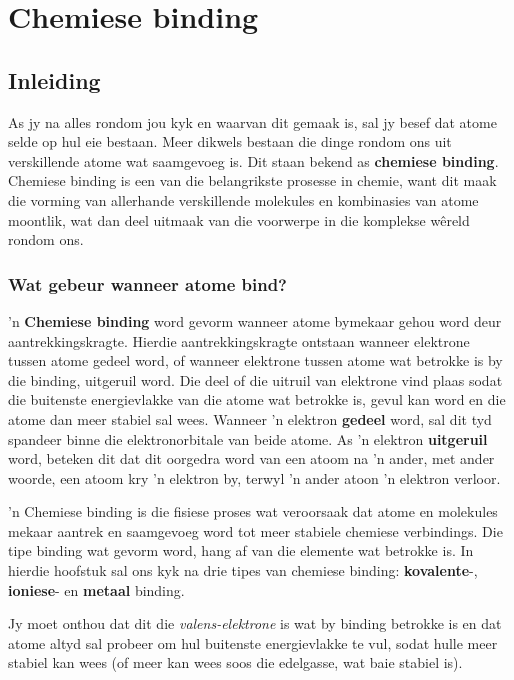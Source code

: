          \chapter{Chemiese binding}
    \setcounter{figure}{1}
    \setcounter{subfigure}{1}
    \label{m38704*cid1}
            \section{Inleiding}
            \nopagebreak

As jy na alles rondom jou kyk en waarvan dit gemaak is, sal jy besef dat atome selde op hul  eie bestaan. Meer dikwels bestaan die dinge rondom ons ​​uit verskillende atome wat saamgevoeg is. Dit staan bekend as \textbf{chemiese binding}. Chemiese binding is een van die belangrikste prosesse in chemie, want dit maak die vorming van allerhande verskillende molekules en kombinasies van atome moontlik, wat dan deel uitmaak van die voorwerpe in die komplekse w\^{e}reld rondom ons. \par 
    \label{m38704*cid4}
            \subsection*{Wat gebeur wanneer atome bind?}
            \nopagebreak
      \label{m38704*id138842} 'n \textbf{Chemiese binding} word gevorm wanneer atome bymekaar gehou word deur aantrekkingskragte. Hierdie aantrekkingskragte ontstaan wanneer elektrone tussen atome gedeel word, of wanneer elektrone tussen atome wat betrokke is by die binding, uitgeruil word. Die deel of die uitruil van elektrone vind plaas sodat die buitenste energievlakke van die atome wat betrokke is, gevul kan word en die atome dan meer stabiel sal wees. Wanneer  'n elektron \textbf{gedeel} word, sal dit tyd spandeer binne die elektronorbitale van beide atome. As  'n elektron \textbf{uitgeruil} word, beteken dit dat dit oorgedra word van een atoom na  'n ander, met ander woorde, een atoom kry  'n elektron by, terwyl   'n ander atoon   'n elektron verloor.\par 
\label{m38704*fhsst!!!underscore!!!id83}
 {  'n Chemiese binding is die fisiese proses wat veroorsaak dat atome en molekules mekaar aantrek en saamgevoeg word tot meer stabiele chemiese verbindings.} 
      \label{m38704*id138909}Die tipe binding wat gevorm word, hang af van die elemente wat betrokke is. In hierdie hoofstuk
sal ons kyk na drie tipes van chemiese binding: \textbf{kovalente}-, \textbf{ioniese}- en \textbf{metaal} binding.\par 
      \label{m38704*id138929}
Jy moet onthou dat dit die \textsl{valens-elektrone} is wat by binding betrokke is en dat atome altyd sal probeer om hul buitenste energievlakke te vul, sodat hulle meer stabiel kan wees (of meer kan wees soos die edelgasse, wat baie stabiel is).\par 
